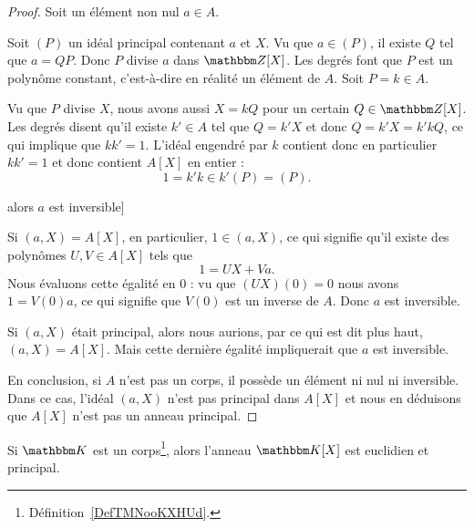 \begin{proof}
    Soit un élément non nul \( a\in A\).
    \begin{subproof}
        \newcommand{\foo}{A[X]}
    \item[Un idéal principal contenant \( a\) et \( X\) est {A[X]}]

            Soit \( (P)\) un idéal principal contenant \( a\) et \( X\). Vu que \( a\in(P)\), il existe \( Q\) tel que \( a=QP\). Donc \( P\) divise \( a\) dans \( \eZ[X]\). Les degrés font que \( P\) est un polynôme constant, c'est-à-dire en réalité un élément de \( A\). Soit \( P=k\in A\).

            Vu que \( P\) divise \( X\), nous avons aussi \( X=kQ\) pour un certain \( Q\in \eZ[X]\). Les degrés disent qu'il existe \( k'\in A\) tel que \( Q=k'X\) et donc \( Q=k'X=k'kQ\), ce qui implique que \( kk'=1\). L'idéal engendré par \( k\) contient donc en particulier \( kk'=1\) et donc contient \( A[X]\) en entier :
            \begin{equation}
                1=k'k\in k'(P)=(P).
            \end{equation}

        \item[Si \( (a,X)=\foo\) alors \( a\) est inversible]

            Si \( (a,X)=A[X]\), en particulier, \( 1\in (a,X)\), ce qui signifie qu'il existe des polynômes \( U,V\in A[X]\) tels que
            \begin{equation}
                1=UX+Va.
            \end{equation}
            Nous évaluons cette égalité en \( 0\) : vu que \( (UX)(0)=0\) nous avons \( 1=V(0)a\), ce qui signifie que \( V(0)\) est un inverse de \( A\). Donc \( a\) est inversible.


        \item[Si \( a\) n'est pas inversible alors \( (a,X)\) n'est pas principal]

            Si \( (a,X)\) était principal, alors nous aurions, par ce qui est dit plus haut, \( (a,X)=A[X]\). Mais cette dernière égalité impliquerait que \( a\) est inversible.
    \end{subproof}
    En conclusion, si \( A\) n'est pas un corps, il possède un élément ni nul ni inversible. Dans ce cas, l'idéal \( (a,X)\) n'est pas principal dans \( A[X]\) et nous en déduisons que \( A[X]\) n'est pas un anneau principal.
\end{proof}

\begin{lemma}       \label{LEMooIDSKooQfkeKp}
    Si \( \eK\) est un corps\footnote{Définition~\ref{DefTMNooKXHUd}.}, alors l'anneau \( \eK[X]\) est euclidien et principal.
\end{lemma}

